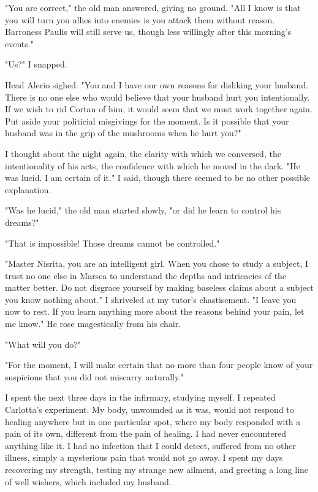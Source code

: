 \documentclass{article}
\begin{document}
"You are correct," the old man answered, giving no ground. "All I know is that you will turn you allies into enemies is you attack them without reason. Barroness Paulis will still serve us, though less willingly after this morning's events."

"Us?" I snapped.

Head Alerio sighed. "You and I have our own reasons for disliking your husband. There is no one else who would believe that your husband hurt you intentionally. If we wish to rid Cortan of him, it would seem that we must work together again. Put aside your politicial misgivings for the moment. Is it possible that your husband was in the grip of the mushrooms when he hurt you?"

I thought about the night again, the clarity with which we conversed, the intentionality of his acts, the confidence with which he moved in the dark. "He was lucid. I am certain of it." I said, though there seemed to be no other possible explanation. 

"Was he lucid," the old man started slowly, "or did he learn to control his dreams?"

"That is impossible! Those dreams cannot be controlled."

"Master Nisrita, you are an intelligent girl. When you chose to study a subject, I trust no one else in Marsea to understand the depths and intricacies of the matter better. Do not disgrace yourself by making baseless claims about a subject you know nothing about." I shriveled at my tutor's chastisement. "I leave you now to rest. If you learn anything more about the reasons behind your pain, let me know." He rose magestically from his chair.

"What will you do?"

"For the moment, I will make certain that no more than four people know of your suspicions that you did not miscarry naturally."

\vspace{.5cm}

I spent the next three days in the infirmary, studying myself. I repeated Carlotta's experiment. My body, unwounded as it was, would not respond to healing anywhere but in one particular spot, where my body responded with a pain of its own, different from the pain of healing. I had never encountered anything like it. I had no infection that I could detect, suffered from no other illness, simply a mysterious pain that would not go away. I spent my days recovering my strength, testing my strange new ailment, and greeting a long line of well wishers, which included my husband. 
\end{document}
